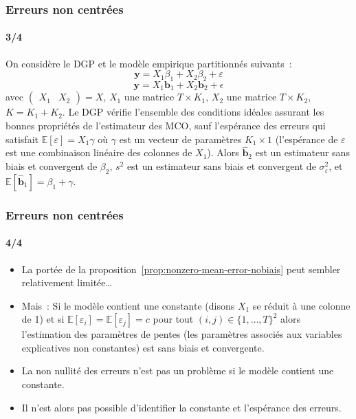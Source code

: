 \documentclass[10pt]{beamer}
\begin{document}
\begin{frame}
  \frametitle{Erreurs non centrées}
  \framesubtitle{3/4}

  \begin{prop}\label{prop:nonzero-mean-error-nobiais}
    On considère le DGP et le modèle empirique partitionnés suivants~:
    \[
      \mathbf y = X_1\beta_1 + X_2\beta_2 + \varepsilon
    \]
    \[
      \mathbf y = X_1\mathbf b_1 + X_2\mathbf b_2 + \epsilon
    \]
    avec $\begin{pmatrix}X_1 & X_2\end{pmatrix}=X$, $X_1$ une
    matrice $T\times K_1$, $X_2$ une
    matrice $T\times K_2$, $K = K_1+K_2$. Le DGP vérifie l'ensemble
    des conditions idéales assurant les bonnes propriétés de
    l'estimateur des MCO, sauf l'espérance des erreurs qui satisfait $\mathbb E \left[ \varepsilon \right] = X_1\gamma $
    où $\gamma$ est un vecteur de paramètres $K_1\times 1$
    (l'espérance de $\varepsilon$ est une combinaison linéaire des
    colonnes de $X_1$). Alors $\hat{\mathbf b}_2$ est un estimateur
    sans biais et convergent de $\beta_2$, $s^2$ est un estimateur
    sans biais et convergent de $\sigma_{\varepsilon}^2$,
    et $\mathbb E\left[ \hat{\mathbf b}_1 \right] = \beta_1+\gamma$.
  \end{prop}

\end{frame}


\begin{frame}
  \frametitle{Erreurs non centrées}
  \framesubtitle{4/4}

  \begin{itemize}

  \item La portée de la proposition~\ref{prop:nonzero-mean-error-nobiais} peut sembler relativement limitée\dots\newline

  \item Mais~: Si le modèle contient une constante (disons $X_1$ se réduit à une colonne de 1) et si $\mathbb E[\varepsilon_i] = \mathbb E[\varepsilon_j] = c$ pour tout $(i,j)\in\{1,\dots,T\}^2$ alors l'estimation des paramètres de pentes (les paramètres associés aux variables explicatives non constantes) est sans biais et convergente.\newline

  \item[$\Rightarrow$] La non nullité des erreurs n'est pas un problème si le modèle contient une constante.\newline

  \item[\dbend] Il n'est alors pas possible d'identifier la constante et l'espérance des erreurs.

  \end{itemize}

\end{frame}
\end{document}
